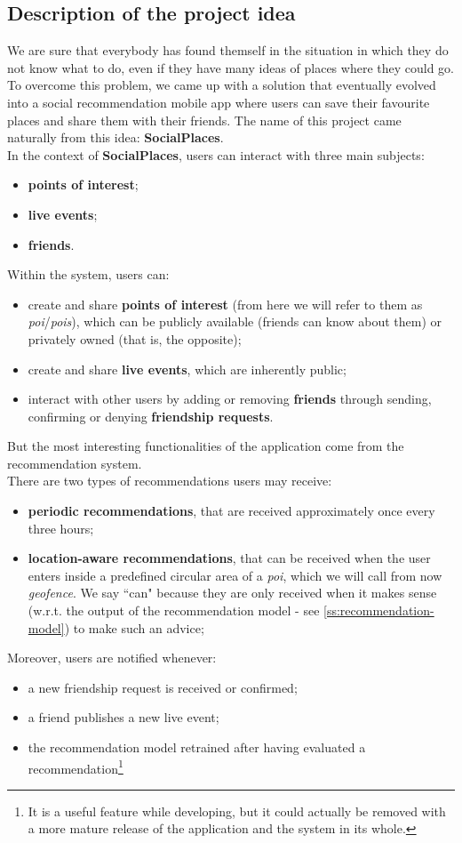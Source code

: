\documentclass[../../main]{subfiles}
\begin{document}
\subsection{Description of the project idea}
\label{ss:description-project-idea}

We are sure that everybody has found themself in the situation in which they do not know what to do, even if they have many ideas of places where they could go.
To overcome this problem, we came up with a solution that eventually evolved into a social recommendation mobile app where users can save their favourite places and share them with their friends.
The name of this project came naturally from this idea: \textbf{SocialPlaces}.\\
In the context of \textbf{SocialPlaces}, users can interact with three main subjects:
\begin{itemize}
    \item \textbf{points of interest};
    \item \textbf{live events};
    \item \textbf{friends}.
\end{itemize}
Within the system, users can:
\begin{itemize}
    \item create and share \textbf{points of interest} (from here we will refer to them as \textit{poi}/\textit{pois}), which can be publicly available (friends can know about them) or privately owned (that is, the opposite);
    \item create and share \textbf{live events}, which are inherently public;
    \item interact with other users by adding or removing \textbf{friends} through sending, confirming or denying \textbf{friendship requests}.
\end{itemize}
But the most interesting functionalities of the application come from the recommendation system.\\
There are two types of recommendations users may receive:
\begin{itemize}
    \item \textbf{periodic recommendations}, that are received approximately once every three hours;
    \item \textbf{location-aware recommendations}, that can be received when the user enters inside a predefined circular area of a \textit{poi}, which we will call from now \textit{geofence}.
    We say ``can" because they are only received when it makes sense (w.r.t. the output of the recommendation model - see \ref{ss:recommendation-model}) to make such an advice;
\end{itemize}
Moreover, users are notified whenever:
\begin{itemize}
    \item a new friendship request is received or confirmed;
    \item a friend publishes a new live event;
    \item the recommendation model retrained after having evaluated a recommendation\footnote{It is a useful feature while developing, but it could actually be removed with a more mature release of the application and the system in its whole.}
\end{itemize}
\end{document}
